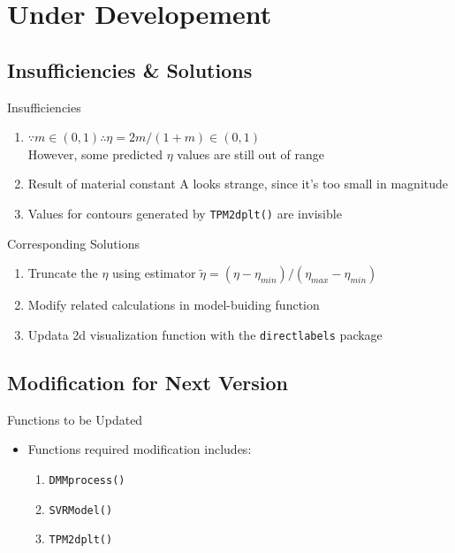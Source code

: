 \documentclass[11pt]{beamer}
\newcommand{\code}[1]{\texttt{#1}}
\begin{document}
\section{Under Developement}
\subsection{Insufficiencies \& Solutions}
\begin{frame}{Insufficiencies}
\begin{enumerate}
	\item $\because m \in (0, 1) \therefore \eta = 2m/(1+m) \in (0, 1)$\\ However, some predicted $\eta$ values are still out of range
	\singlespacing
	\item Result of material constant A looks strange, since it's too small in magnitude
	\singlespacing
	\item Values for contours generated by \code{TPM2dplt()}  are invisible
\end{enumerate}
\end{frame}

\begin{frame}{Corresponding Solutions}
\begin{enumerate}
	\item Truncate the $\eta$ using estimator $\tilde{\eta} = (\eta - \eta_{min})/(\eta_{max} - \eta_{min})$
	\singlespacing
	\item Modify related calculations in model-buiding function
	\singlespacing
	\item Updata 2d visualization function with the \code{directlabels} package
\end{enumerate}
\end{frame}

\subsection{Modification for Next Version}
\begin{frame}{Functions to be Updated}
\begin{itemize}
	\item Functions required modification includes:
	\singlespacing
	\begin{enumerate}
		\item \code{DMMprocess()}
		\item \code{SVRModel()}
		\item \code{TPM2dplt()}
	\end{enumerate}
\end{itemize}
\end{frame}
\end{document}
